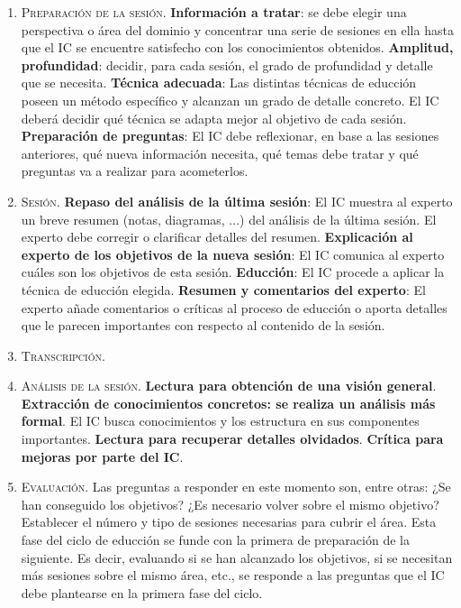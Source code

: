 \documentclass[12pt]{article}
\begin{document}
\begin{enumerate}
\item \textsc{Preparación de la sesión}. \textbf{Información a tratar}: se debe elegir una perspectiva o área del dominio y concentrar una serie de sesiones en ella hasta que el IC se encuentre satisfecho con los conocimientos obtenidos. \textbf{Amplitud, profundidad}: decidir, para cada sesión, el grado de profundidad y detalle que se necesita. \textbf{Técnica adecuada}: Las distintas técnicas de educción poseen un método específico y alcanzan un grado de detalle concreto. El IC deberá decidir qué técnica se adapta mejor al objetivo de cada sesión. \textbf{Preparación de preguntas}: El IC debe reflexionar, en base a las sesiones anteriores, qué nueva información necesita, qué temas debe tratar y qué preguntas va a realizar para acometerlos.
\item  \textsc{Sesión}. \textbf{Repaso del análisis de la última sesión}: El IC muestra al experto un breve resumen (notas, diagramas, ...) del análisis de la última sesión. El experto debe corregir o clarificar detalles del resumen. \textbf{Explicación al experto de los objetivos de la nueva sesión}: El IC comunica al experto cuáles son los objetivos de esta sesión. \textbf{Educción}: El IC procede a aplicar la técnica de educción elegida. \textbf{Resumen y comentarios del experto}: El experto añade comentarios o críticas al proceso de educción o aporta detalles que le parecen importantes con respecto al contenido de la sesión.
\item \textsc{Transcripción}. 
\item \textsc{Análisis de la sesión}. \textbf{Lectura para obtención de una visión general}. \textbf{Extracción de conocimientos concretos: se realiza un análisis más formal}. El IC busca conocimientos y los estructura en sus componentes importantes.  \textbf{Lectura para recuperar detalles olvidados}. \textbf{Crítica para mejoras por parte del IC}.
\item \textsc{Evaluación}. Las preguntas a responder en este momento son, entre otras: ¿Se han conseguido los objetivos? ¿Es necesario volver sobre el mismo objetivo? Establecer el número y tipo de sesiones necesarias para cubrir el área. Esta fase del ciclo de educción se funde con la primera de preparación de la siguiente. Es decir, evaluando si se han alcanzado los objetivos, si se necesitan más sesiones sobre el mismo área, etc., se responde a las preguntas que el IC debe plantearse en la primera fase del ciclo.
\end{enumerate}
\end{document}
